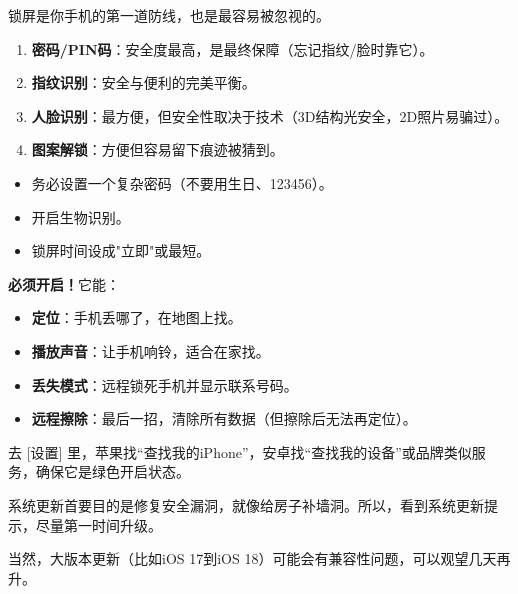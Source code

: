 


锁屏是你手机的第一道防线，也是最容易被忽视的。


\begin{enumerate}
  \item \textbf{密码/PIN码}：安全度最高，是最终保障（忘记指纹/脸时靠它）。
  \item \textbf{指纹识别}：安全与便利的完美平衡。
  \item \textbf{人脸识别}：最方便，但安全性取决于技术（3D结构光安全，2D照片易骗过）。
  \item \textbf{图案解锁}：方便但容易留下痕迹被猜到。
\end{enumerate}


\begin{itemize}
  \item 务必设置一个复杂密码（不要用生日、123456）。
  \item 开启生物识别。
  \item 锁屏时间设成"立即"或最短。
\end{itemize}


\textbf{必须开启！}它能：

\begin{itemize}
  \item \textbf{定位}：手机丢哪了，在地图上找。
  \item \textbf{播放声音}：让手机响铃，适合在家找。
  \item \textbf{丢失模式}：远程锁死手机并显示联系号码。
  \item \textbf{远程擦除}：最后一招，清除所有数据（但擦除后无法再定位）。
\end{itemize}

去 [设置] 里，苹果找“查找我的iPhone”，安卓找“查找我的设备”或品牌类似服务，确保它是绿色开启状态。


系统更新首要目的是修复安全漏洞，就像给房子补墙洞。所以，看到系统更新提示，尽量第一时间升级。

当然，大版本更新（比如iOS 17到iOS 18）可能会有兼容性问题，可以观望几天再升。

